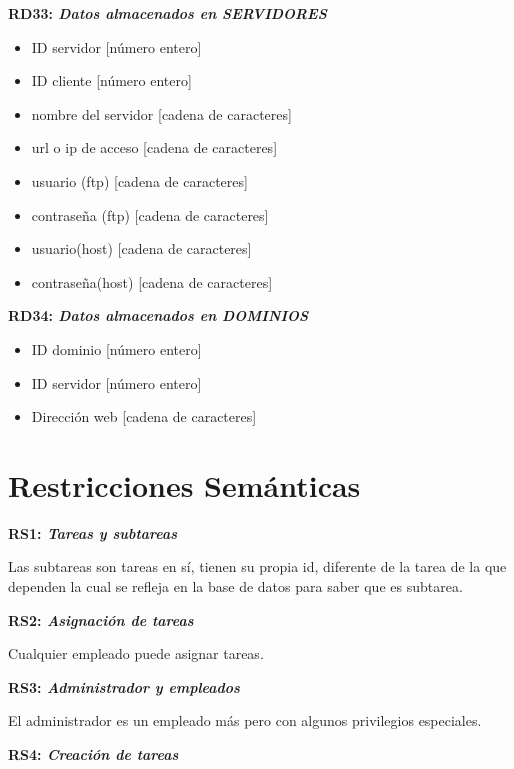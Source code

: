 \documentclass[paper=a4, fontsize=11pt, spanish]{scrartcl}
\begin{document}
\setlength{\parindent}{0em}
\textbf{RD33: \textit{Datos almacenados en SERVIDORES}}
\setlength{\parindent}{2em}
\begin{itemize}
  \item ID servidor [número entero]
  \item ID cliente [número entero]
  \item nombre del servidor [cadena de caracteres]
  \item url o ip de acceso [cadena de caracteres]
  \item usuario (ftp) [cadena de caracteres]
  \item contraseña (ftp) [cadena de caracteres]
  \item usuario(host) [cadena de caracteres]
  \item contraseña(host) [cadena de caracteres]
\end{itemize}

\setlength{\parindent}{0em}
\textbf{RD34: \textit{Datos almacenados en DOMINIOS}}
\setlength{\parindent}{2em}
\begin{itemize}
  \item ID dominio [número entero]
  \item ID servidor [número entero]
  \item Dirección web [cadena de caracteres]
\end{itemize}

\section{Restricciones Semánticas}
\setlength{\parindent}{0em}
\textbf{RS1: \textit{Tareas y subtareas}}
\setlength{\parindent}{2em}

Las subtareas son tareas en sí, tienen su propia id, diferente de la tarea de la que dependen la cual se refleja en la base de datos para saber que es subtarea.

\setlength{\parindent}{0em}
\textbf{RS2: \textit{Asignación de tareas}}
\setlength{\parindent}{2em}

Cualquier empleado puede asignar tareas.

\setlength{\parindent}{0em}
\textbf{RS3: \textit{Administrador y empleados}}
\setlength{\parindent}{2em}

El administrador es un empleado más pero con algunos privilegios especiales.

\setlength{\parindent}{0em}
\textbf{RS4: \textit{Creación de tareas}}
\setlength{\parindent}{2em}
\end{document}
